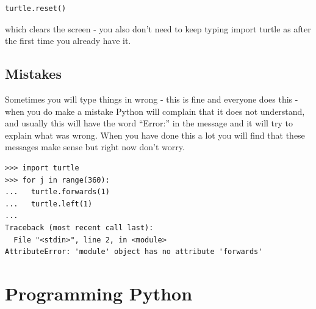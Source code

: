 \documentclass[a4paper, 11pt]{book}
\begin{document}
{\small
\begin{verbatim}
turtle.reset()
\end{verbatim}
}

\noindent
which clears the screen - you also don't need to keep typing import
turtle as after the first time you already have it.

\section{Mistakes}

Sometimes you will type things in wrong - this is fine and everyone does this - when you do make a mistake Python will complain that it does not understand, and usually this will have the word ``Error:'' in the message and it will try to explain what was wrong. When you have done this a lot you will find that these messages make sense but right now don't worry.

{\small
\begin{verbatim}
>>> import turtle
>>> for j in range(360):
...   turtle.forwards(1)
...   turtle.left(1)
... 
Traceback (most recent call last):
  File "<stdin>", line 2, in <module>
AttributeError: 'module' object has no attribute 'forwards'
\end{verbatim}
}

\chapter{Programming Python}
\end{document}
